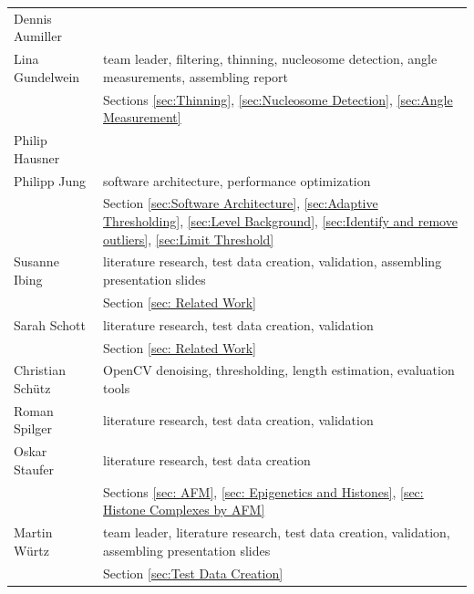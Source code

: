 \documentclass{article}
\begin{document}
\begin{table}[htb]\label{tab: tasks}
\begin{tabular}{p{2.8cm}p{8.3cm}}
Dennis Aumiller &\\[1em]
Lina Gundelwein & team leader, filtering, thinning, nucleosome detection, angle measurements, assembling report\\
&Sections \ref{sec:Thinning}, \ref{sec:Nucleosome Detection}, \ref{sec:Angle Measurement}\\[1em]
Philip Hausner& \\[1em]
Philipp Jung &  software architecture, performance optimization\\
&Section \ref{sec:Software Architecture}, \ref{sec:Adaptive Thresholding}, \ref{sec:Level Background}, \ref{sec:Identify and remove outliers}, \ref{sec:Limit Threshold}\\[1em]
Susanne Ibing & literature research, test data creation, validation, assembling presentation slides\\
& Section \ref{sec: Related Work}\\[1em]
Sarah Schott & literature research, test data creation, validation\\
& Section \ref{sec: Related Work}\\[1em]
Christian Schütz& OpenCV denoising, thresholding, length estimation, evaluation tools\\[1em]
Roman Spilger& literature research, test data creation, validation\\[1em]
Oskar Staufer & literature research, test data creation \\
& Sections \ref{sec: AFM}, \ref{sec: Epigenetics and Histones}, \ref{sec: Histone Complexes by AFM} \\[1em]
Martin Würtz & team leader, literature research, test data creation, validation, assembling presentation slides\\
&Section \ref{sec:Test Data Creation}\\
\end{tabular}
\end{table}
\end{document}
